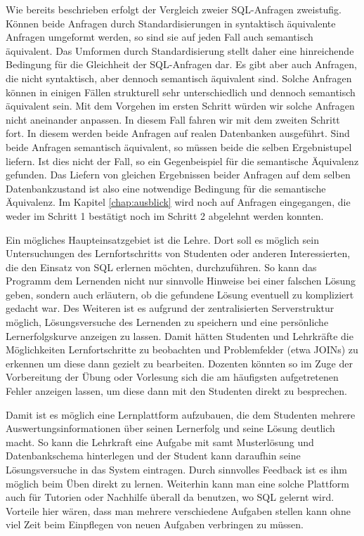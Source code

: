 Wie bereits beschrieben erfolgt der Vergleich zweier SQL-Anfragen zweistufig. Können beide Anfragen durch Standardisierungen in syntaktisch äquivalente Anfragen umgeformt werden, so sind sie auf jeden Fall auch semantisch äquivalent. Das Umformen durch Standardisierung stellt daher eine hinreichende Bedingung für die Gleichheit der SQL-Anfragen dar. Es gibt aber auch Anfragen, die nicht syntaktisch, aber dennoch semantisch äquivalent sind. Solche Anfragen können in einigen Fällen strukturell sehr unterschiedlich und dennoch semantisch äquivalent sein. Mit dem Vorgehen im ersten Schritt würden wir solche Anfragen nicht aneinander anpassen. In diesem Fall fahren wir mit dem zweiten Schritt fort. In diesem werden beide Anfragen auf realen Datenbanken ausgeführt. Sind beide Anfragen semantisch äquivalent, so müssen beide die selben Ergebnistupel liefern. Ist dies nicht der Fall, so ein Gegenbeispiel für die semantische Äquivalenz gefunden. Das Liefern von gleichen Ergebnissen beider Anfragen auf dem selben Datenbankzustand ist also eine notwendige Bedingung für die semantische Äquivalenz. Im Kapitel \ref{chap:ausblick} wird noch auf Anfragen eingegangen, die weder im Schritt 1 bestätigt noch im Schritt 2 abgelehnt werden konnten. 


Ein mögliches Haupteinsatzgebiet ist die Lehre. Dort soll es möglich sein Untersuchungen des Lernfortschritts von Studenten oder anderen Interessierten, die den Einsatz von SQL erlernen möchten, durchzuführen. So kann das Programm dem Lernenden nicht nur sinnvolle Hinweise bei einer falschen Lösung geben, sondern auch erläutern, ob die gefundene Lösung eventuell zu kompliziert gedacht war. Des Weiteren ist es aufgrund der zentralisierten Serverstruktur möglich, Lösungsversuche des Lernenden zu speichern und eine persönliche Lernerfolgskurve anzeigen zu lassen. Damit hätten Studenten und Lehrkräfte die Möglichkeiten Lernfortschritte zu beobachten und Problemfelder (etwa JOINs) zu erkennen um diese dann gezielt zu bearbeiten. Dozenten könnten so im Zuge der Vorbereitung der Übung oder Vorlesung sich die am häufigsten aufgetretenen Fehler anzeigen lassen, um diese dann mit den Studenten direkt zu besprechen.

Damit ist es möglich eine Lernplattform aufzubauen, die dem Studenten mehrere Auswertungsinformationen über seinen Lernerfolg und seine Lösung deutlich macht. So kann die Lehrkraft eine Aufgabe mit samt Musterlösung und Datenbankschema hinterlegen und der Student kann daraufhin seine Lösungsversuche in das System eintragen. Durch sinnvolles Feedback ist es ihm möglich beim Üben direkt zu lernen. Weiterhin kann man eine solche Plattform auch für Tutorien oder Nachhilfe überall da benutzen, wo SQL gelernt wird. Vorteile hier wären, dass man mehrere verschiedene Aufgaben stellen kann ohne viel Zeit beim Einpflegen von neuen Aufgaben verbringen zu müssen.

